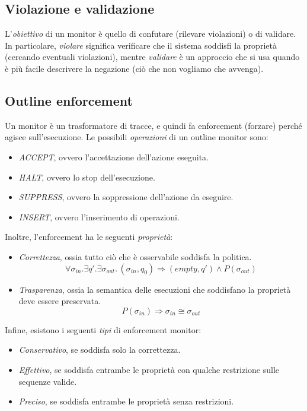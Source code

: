 \documentclass[a4paper,oneside,titlepage]{book}
\begin{document}
\subsection{Violazione e validazione}
L'\textit{obiettivo} di un monitor è quello di confutare (rilevare violazioni) o di validare. In particolare, \textit{violare} significa verificare che il sistema soddisfi la proprietà (cercando eventuali violazioni), mentre \textit{validare} è un approccio che si usa quando è più facile descrivere la negazione (ciò che non vogliamo che avvenga).

\subsection{Outline enforcement}
Un monitor è un trasformatore di tracce, e quindi fa enforcement (forzare) perché agisce sull'esecuzione. Le possibili \textit{operazioni} di un outline monitor sono:
\begin{itemize}
    \item \textit{ACCEPT}, ovvero l'accettazione dell'azione eseguita.
    \item \textit{HALT}, ovvero lo stop dell'esecuzione.
    \item \textit{SUPPRESS}, ovvero la soppressione dell'azione da eseguire.
    \item \textit{INSERT}, ovvero l'inserimento di operazioni.
\end{itemize}
Inoltre, l'enforcement ha le seguenti \textit{proprietà}:
\begin{itemize}
    \item \textit{Correttezza}, ossia tutto ciò che è osservabile soddisfa la politica.
    \[ \forall \sigma_{in}. \exists q'. \exists \sigma_{out}.\, (\sigma_{in}, q_0) \Rightarrow (empty, q') \wedge P(\sigma_{out}) \]
    \item \textit{Trasparenza}, ossia la semantica delle esecuzioni che soddisfano la proprietà deve essere preservata.
    \[ P(\sigma_{in}) \Rightarrow \sigma_{in} \cong \sigma_{out} \]
\end{itemize}
Infine, esistono i seguenti \textit{tipi} di enforcement monitor:
\begin{itemize}
    \item \textit{Conservativo}, se soddisfa solo la correttezza.
    \item \textit{Effettivo}, se soddisfa entrambe le proprietà con qualche restrizione sulle sequenze valide.
    \item \textit{Preciso}, se soddisfa entrambe le proprietà senza restrizioni.
\end{itemize}
\end{document}
